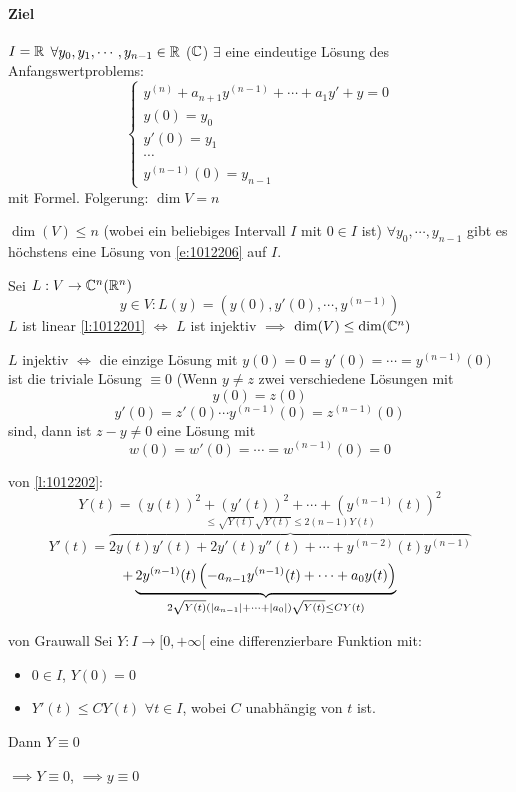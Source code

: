\paragraph{Ziel} $I=\mathbb{R}$ $\forall y_0,y_1,\cdots,y_{n-1}\in\mathbb{R}$ ($\mathbb{C}$) $\exists$ eine eindeutige Lösung des Anfangswertproblems:
\begin{equation}
  \label{e:1012206}
  \begin{cases}
    y^{(n)}+a_{n+1}y^{(n-1)}+\cdots+a_1y'+y=0\\
    y(0)=y_0\\
    y'(0)=y_1\\
    \cdots\\
    y^{(n-1)}(0)=y_{n-1}
  \end{cases}
\end{equation}
mit Formel. Folgerung: $\dim V=n$
\begin{Lem} \label{l:1012201}
  $\dim(V)\leq n$ (wobei ein beliebiges Intervall $I$ mit $0\in I$ ist) $\forall y_0,\cdots,y_{n-1}$ gibt es höchstens eine Lösung von \ref{e:1012206} auf $I$.
\end{Lem}
\begin{Bew}
  Sei $L:V\to\mathbb{C}^n(\mathbb{R}^n)$
  \[y\in V:L(y)=\left( y(0),y'(0),\cdots,y^{(n-1)} \right)\]
  $L$ ist linear \ref{l:1012201} $\iff$ $L$ ist injektiv $\implies$ $\dim(V)\leq \dim(\mathbb{C}^n)$
  \begin{Lem} \label{l:1012202}
    $L$ injektiv $\iff$ die einzige Lösung mit $y(0)=0=y'(0)=\cdots=y^{(n-1)}(0)$ ist die triviale Lösung $\equiv 0$ (Wenn $y\neq z$ zwei verschiedene Lösungen mit
    \[y(0)=z(0)\]
    \[y'(0)=z'(0)\cdots y^{(n-1)}(0)=z^{(n-1)}(0)\]
    sind, dann ist $z-y\neq 0$ eine Lösung mit
    \[w(0)=w'(0)=\cdots=w^{(n-1)}(0)=0\]
  \end{Lem}
  \begin{Bew}
    von \ref{l:1012202}:
    \[Y(t)=\left( y(t) \right)^2+\left( y'(t) \right)^2+\cdots+\left( y^{(n-1)}(t) \right)^2\]
    \[Y'(t)=\overbrace{2y(t)y'(t)+2y'(t)y''(t)+\cdots+y^{(n-2)}(t)y^{(n-1)}}^{\leq\sqrt{Y(t)}\sqrt{Y(t)}\leq 2(n-1)Y(t)}\]
    \[+\underbrace{2y^{(n-1)}(t)\left( -a_{n-1}y^{(n-1)}(t)+\cdots+a_0y(t) \right)}_{2\sqrt{Y(t)}\left( \mathopen| a_{n-1} \mathclose|+\cdots+\mathopen| a_0 \mathclose| \right)\sqrt{Y(t)}\leq C Y(t)}\]
    \begin{Lem}{von Grauwall}
      Sei $Y:I\to [0,+\infty[$ eine differenzierbare Funktion mit:
      \begin{itemize}
        \item $0\in I$, $Y(0)=0$
        \item $Y'(t)\leq C Y(t)$ $\forall t\in I$, wobei $C$ unabhängig von $t$ ist.
      \end{itemize}
      Dann $Y\equiv 0$
    \end{Lem}
    $\implies Y\equiv 0$, $\implies y\equiv 0$
  \end{Bew}
\end{Bew}
